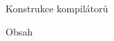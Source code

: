 \nopagenumbers

\tit Konstrukce kompilátorů
\newpage

\nonum\notoc\sec Obsah
\maketoc
\newpage

\pagenumbers
